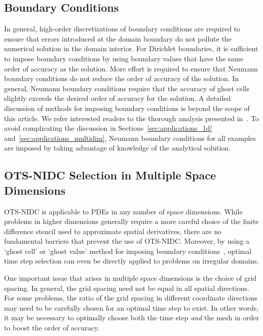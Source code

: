 \documentclass[fleqn,12pt,twoside]{article}
\begin{document}
\subsection{Boundary Conditions}
In general, high-order discretizations of boundary conditions are required 
to ensure that errors introduced at the domain boundary do not pollute 
the numerical solution in the domain interior.  For Dirichlet boundaries, 
it is sufficient to impose boundary conditions by using boundary values 
that have the same order of accuracy as the solution.  More effort is 
required to ensure that Neumann boundary conditions do not reduce the order 
of accuracy of the solution.  In general, Neumann boundary conditions require 
that the accuracy of ghost cells slightly exceeds the desired order of 
accuracy for the solution.  A detailed discussion of methods for imposing 
boundary conditions is beyond the scope of this article.  We refer interested 
readers to the thorough analysis presented in~\cite{gko_book}.  To avoid 
complicating the discussion in Sections~\ref{sec:applications_1d} 
and~\ref{sec:applications_multidim}, Neumann boundary conditions for
all examples are imposed by taking advantage of knowledge of the analytical 
solution.


\subsection{\label{sec:ots_nidc_higher_spatial_dims}
            OTS-NIDC Selection in Multiple Space Dimensions}
OTS-NIDC is applicable to PDEs in any number of space dimensions.  While 
problems in higher dimensions generally require a more careful choice of the 
finite difference stencil used to approximate spatial derivatives, there are 
no fundamental barriers that prevent the use of OTS-NIDC.  Moreover, by using 
a `ghost cell' or `ghost value' method for imposing boundary 
conditions~\cite{gibou_2005,ito_2005,fedkiw_1999,osher_fedkiw_book},
optimal time step selection can even be directly applied to problems on 
irregular domains.  

One important issue that arises in multiple space dimensions is the choice
of grid spacing.  In general, the grid spacing need not be equal in all 
spatial directions.  For some problems, the ratio of the grid spacing in
different coordinate directions may need to be carefully chosen for an 
optimal time step to exist.  In other words, it may be necessary to optimally 
choose both the time step \emph{and} the mesh in order to boost the order 
of accuracy.
\end{document}
